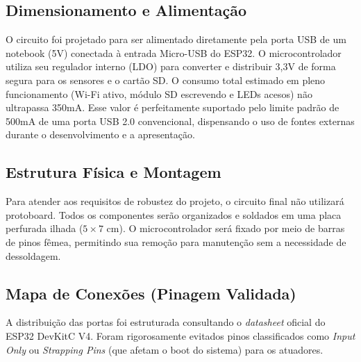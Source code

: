\subsection{Dimensionamento e Alimentação}
O circuito foi projetado para ser alimentado diretamente pela porta USB de um notebook (5V) conectada à entrada Micro-USB do ESP32. O microcontrolador utiliza seu regulador interno (LDO) para converter e distribuir 3,3V de forma segura para os sensores e o cartão SD. O consumo total estimado em pleno funcionamento (Wi-Fi ativo, módulo SD escrevendo e LEDs acesos) não ultrapassa 350mA. Esse valor é perfeitamente suportado pelo limite padrão de 500mA de uma porta USB 2.0 convencional, dispensando o uso de fontes externas durante o desenvolvimento e a apresentação.

\subsection{Estrutura Física e Montagem}
Para atender aos requisitos de robustez do projeto, o circuito final não utilizará protoboard. Todos os componentes serão organizados e soldados em uma placa perfurada ilhada ($5\times7$ cm). O microcontrolador será fixado por meio de barras de pinos fêmea, permitindo sua remoção para manutenção sem a necessidade de dessoldagem.

\subsection{Mapa de Conexões (Pinagem Validada)}
A distribuição das portas foi estruturada consultando o \textit{datasheet} oficial do ESP32 DevKitC V4. Foram rigorosamente evitados pinos classificados como \textit{Input Only} ou \textit{Strapping Pins} (que afetam o boot do sistema) para os atuadores.

